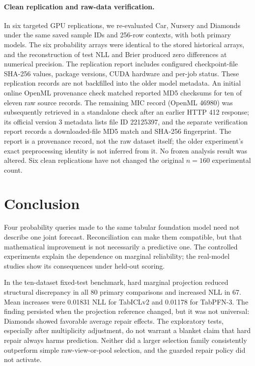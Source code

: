 \documentclass[a4paper,fleqn]{cas-sc}
\begin{document}
\paragraph{Clean replication and raw-data verification.}
In six targeted GPU replications, we re-evaluated Car, Nursery and Diamonds under the same saved sample IDs and 256-row contexts, with both primary models. The six probability arrays were identical to the stored historical arrays, and the reconstruction of test NLL and Brier produced zero differences at numerical precision. The replication report includes configured checkpoint-file SHA-256 values, package versions, CUDA hardware and per-job status. These replication records are not backfilled into the older model metadata. An initial online OpenML provenance check matched reported MD5 checksums for ten of eleven raw source records. The remaining MIC record (OpenML 46980) was subsequently retrieved in a standalone check after an earlier HTTP 412 response; its official version 3 metadata lists file ID 22125397, and the separate verification report records a downloaded-file MD5 match and SHA-256 fingerprint. The report is a provenance record, not the raw dataset itself; the older experiment's exact preprocessing identity is not inferred from it. No frozen analysis result was altered. Six clean replications have not changed the original $n=160$ experimental count.

\FloatBarrier
\section{Conclusion}
Four probability queries made to the same tabular foundation model need not describe one joint forecast. Reconciliation can make them compatible, but that mathematical improvement is not necessarily a predictive one. The controlled experiments explain the dependence on marginal reliability; the real-model studies show its consequences under held-out scoring.

In the ten-dataset fixed-test benchmark, hard marginal projection reduced structural discrepancy in all 80 primary comparisons and increased NLL in 67. Mean increases were 0.01831 NLL for TabICLv2 and 0.01178 for TabPFN-3. The finding persisted when the projection reference changed, but it was not universal: Diamonds showed favorable average repair effects. The exploratory tests, especially after multiplicity adjustment, do not warrant a blanket claim that hard repair always harms prediction. Neither did a larger selection family consistently outperform simple raw-view-or-pool selection, and the guarded repair policy did not activate.
\end{document}
